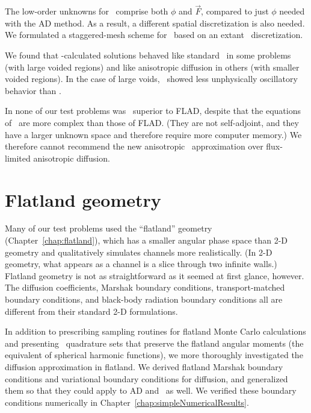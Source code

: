 The low-order unknowns for \APone\ comprise both $\phi$ and $\vec{F}$, compared
to just $\phi$ needed with the AD method.  As a result, a different spatial
discretization is also needed. We formulated a staggered-mesh
scheme for \APone\ based on an extant \Pone\ discretization.

We found that \APone-calculated solutions behaved like standard \Pone\ in some
problems (with large voided regions) and like anisotropic diffusion in others
(with smaller voided regions). In the case of large voids, \APone\ showed less
unphysically oscillatory behavior than \Pone.

In none of our test problems was \APone\ superior to FLAD,
despite that the equations of \APone\ are more complex than those of FLAD. (They
are not
self-adjoint, and they have a larger unknown space and therefore require more
computer memory.)
We therefore cannot recommend the new anisotropic \Pone\ approximation over
flux-limited anisotropic diffusion.

\section{Flatland geometry}

Many of our test problems used the ``flatland'' geometry
(Chapter~\ref{chap:flatland}), which has a smaller angular phase space than 2-D
geometry and qualitatively simulates channels more realistically. (In 2-D
geometry, what appears as a channel is a slice through two infinite walls.)
Flatland geometry is not as straightforward as it seemed at first glance,
however. The diffusion coefficients, Marshak boundary conditions,
transport-matched boundary conditions, and black-body radiation boundary
conditions all are different from their standard 2-D formulations.

In addition to prescribing sampling routines for flatland Monte Carlo
calculations and presenting \SN\ quadrature sets that preserve the flatland
angular moments (the equivalent of spherical harmonic functions), we more
thoroughly investigated the diffusion approximation in flatland. We derived
flatland Marshak boundary conditions and variational boundary conditions for
diffusion, and generalized them so that they could apply to AD and \APone\ as
well. We verified these boundary conditions numerically in
Chapter~\ref{chap:simpleNumericalResults}.


